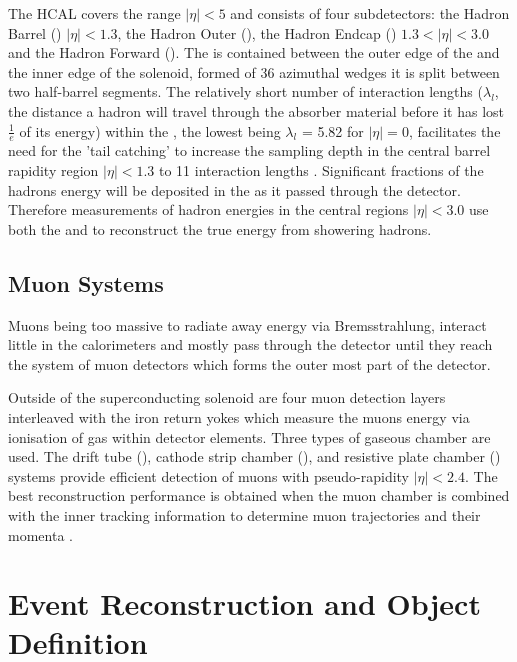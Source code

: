 The HCAL covers the range $\lvert\eta\rvert < 5$ and consists of four subdetectors: the Hadron Barrel (\HB)  $\lvert\eta\rvert < 1.3$, the Hadron Outer (\HO), the Hadron Endcap (\HE) $1.3 < \lvert\eta\rvert < 3.0 $ and the Hadron Forward (\HF).  The \HB is contained between the outer edge of the \ECAL and the inner edge of the solenoid, formed of 36 azimuthal wedges it is split between two half-barrel segments. The relatively short number of interaction lengths ($\lambda_{l}$, the distance a hadron will travel through the absorber material before it has lost $\frac{1}{e}$ of its energy) within the \HB, the lowest being $\lambda_{l}$ = 5.82 for $\lvert\eta\rvert = 0$, facilitates the need for the 'tail catching' \HO to increase the sampling depth in the central barrel rapidity region $\lvert\eta\rvert < 1.3$ to 11 interaction lengths . Significant fractions of the hadrons energy will be deposited in the \ECAL as it passed through the detector. Therefore measurements of hadron energies in the central regions $\lvert\eta\rvert < 3.0$ use both the \ECAL and \HCAL to reconstruct the true energy from showering hadrons. 

\subsection{Muon Systems}
\label{subsec:muonsystems} 
 
Muons being too massive to radiate away energy via Bremsstrahlung, interact little in the calorimeters and mostly pass through the detector until they reach the system of muon detectors which forms the outer most part of the \CMS detector.  

Outside of the superconducting solenoid are four muon detection layers interleaved with the iron return yokes which measure the muons energy via ionisation of gas within detector elements. Three types of gaseous chamber are used. The drift tube (\DT), cathode strip chamber (\CSC), and resistive plate chamber (\RPC) systems provide efficient detection of muons with pseudo-rapidity $\lvert\eta\rvert < 2.4 $. The best reconstruction performance is obtained when the muon chamber is combined with the inner tracking information to determine muon trajectories and their momenta \cite{CMS_MUON_TDR}.  \\ 


\section{Event Reconstruction and Object Definition}
\label{sec:cmsobjects}

